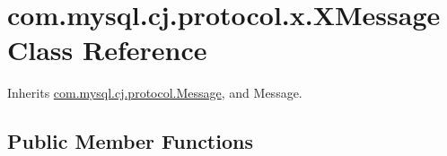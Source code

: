 \hypertarget{classcom_1_1mysql_1_1cj_1_1protocol_1_1x_1_1_x_message}{}\section{com.\+mysql.\+cj.\+protocol.\+x.\+X\+Message Class Reference}
\label{classcom_1_1mysql_1_1cj_1_1protocol_1_1x_1_1_x_message}


Inherits \mbox{\hyperlink{interfacecom_1_1mysql_1_1cj_1_1protocol_1_1_message}{com.\+mysql.\+cj.\+protocol.\+Message}}, and Message.

\subsection*{Public Member Functions}
